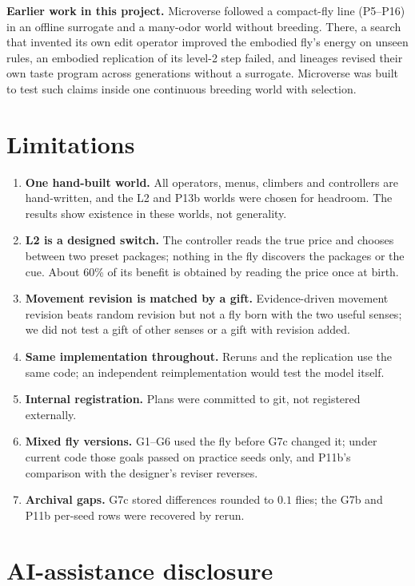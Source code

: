 \documentclass[11pt]{article}
\begin{document}
\textbf{Earlier work in this project.} Microverse followed a compact-fly line (P5--P16) in an offline surrogate and a many-odor world without breeding. There, a search that invented its own edit operator improved the embodied fly's energy on unseen rules, an embodied replication of its level-2 step failed, and lineages revised their own taste program across generations without a surrogate. Microverse was built to test such claims inside one continuous breeding world with selection.

\section{Limitations}
\label{sec:limitations}

\begin{enumerate}
  \item \textbf{One hand-built world.} All operators, menus, climbers and controllers are hand-written, and the L2 and P13b worlds were chosen for headroom. The results show existence in these worlds, not generality.
  \item \textbf{L2 is a designed switch.} The controller reads the true price and chooses between two preset packages; nothing in the fly discovers the packages or the cue. About 60\% of its benefit is obtained by reading the price once at birth.
  \item \textbf{Movement revision is matched by a gift.} Evidence-driven movement revision beats random revision but not a fly born with the two useful senses; we did not test a gift of other senses or a gift with revision added.
  \item \textbf{Same implementation throughout.} Reruns and the replication use the same code; an independent reimplementation would test the model itself.
  \item \textbf{Internal registration.} Plans were committed to git, not registered externally.
  \item \textbf{Mixed fly versions.} G1--G6 used the fly before G7c changed it; under current code those goals passed on practice seeds only, and P11b's comparison with the designer's reviser reverses.
  \item \textbf{Archival gaps.} G7c stored differences rounded to $0.1$ flies; the G7b and P11b per-seed rows were recovered by rerun.
\end{enumerate}

\section{AI-assistance disclosure}
\label{sec:ai-disclosure}
\end{document}
